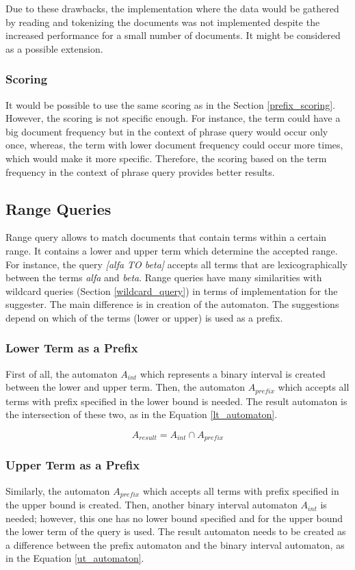Due to these drawbacks, the implementation where the data would be gathered by reading and tokenizing the documents was not
implemented despite the increased performance for a small number of documents. It might be considered as a possible
extension.

\subsubsection{Scoring}
It would be possible to use the same scoring as in the Section \ref{prefix_scoring}. However, the scoring is not specific enough.
For instance, the term could have a big document frequency but in the context of phrase query would occur only once,
whereas, the term with lower document frequency could occur more times, which would make it more specific. Therefore,
the scoring based on the term frequency in the context of phrase query provides better results.

\subsection{Range Queries}
Range query allows to match documents that contain terms within a certain range.
It contains a lower and upper term which determine the accepted range. For instance, the query \textit{[alfa TO beta]}
accepts all terms that are lexicographically between the terms \textit{alfa} and \textit{beta}.
Range queries have many similarities with wildcard queries (Section \ref{wildcard_query}) in terms of implementation for the
suggester. The main difference is in creation of the automaton.
The suggestions depend on which of the terms (lower or upper) is used as a prefix.

\subsubsection{Lower Term as a Prefix}
First of all, the automaton $A_{int}$ which represents a binary interval is created between the lower and upper term. Then,
the automaton $A_{prefix}$ which accepts all terms with prefix specified in the lower bound is needed. The result automaton is the
intersection of these two, as in the Equation \ref{lt_automaton}.

\begin{equation}
\label{lt_automaton}
A_{result} = A_{int} \cap A_{prefix}
\end{equation}

\subsubsection{Upper Term as a Prefix}
Similarly, the automaton $A_{prefix}$ which accepts all terms with prefix specified in the upper bound is created. Then,
another binary interval automaton $A_{int}$ is needed; however, this one has no lower bound specified and for the upper bound the
lower term of the query is used. The result automaton needs to be created as a difference between the prefix automaton
and the binary interval automaton, as in the Equation \ref{ut_automaton}.

